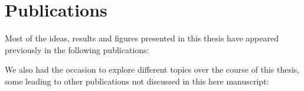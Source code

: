 \documentclass[../thesis.tex]{subfiles}
\begin{document}
\chapter*{Publications}


Most of the ideas, results and figures presented in this thesis have appeared previously
in the following publications:
\printbibliography[heading=none,category=thesis_articles]

We also had the occasion to explore different topics over the course of this thesis, some leading to other publications not discussed in this here manuscript:
\nocite{GanicDynamicNoise2020}
\printbibliography[heading=none,category=other_articles]
\end{document}
